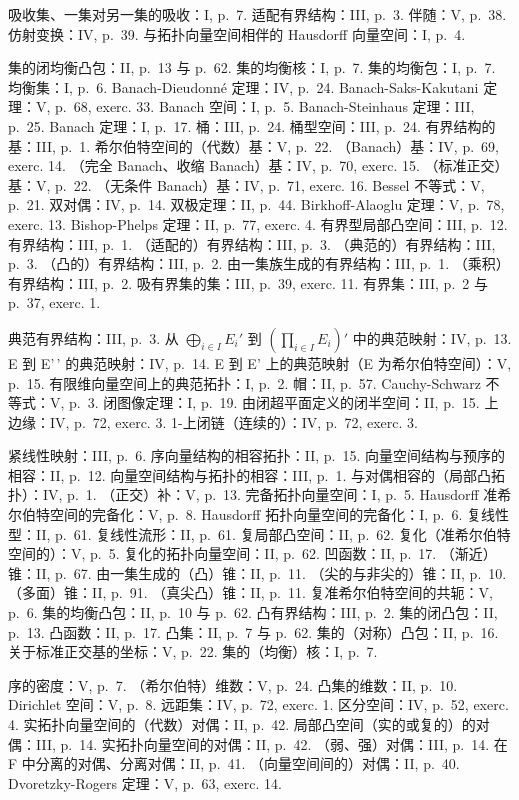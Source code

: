 
吸收集、一集对另一集的吸收：I, p.~7. 适配有界结构：III, p.~3. 伴随：V, p.~38. 仿射变换：IV, p.~39. 与拓扑向量空间相伴的 Hausdorff 向量空间：I, p.~4.

集的闭均衡凸包：II, p.~13 与 p.~62. 集的均衡核：I, p.~7. 集的均衡包：I, p.~7. 均衡集：I, p.~6. Banach-Dieudonné 定理：IV, p.~24. Banach-Saks-Kakutani 定理：V, p.~68, exerc. 33. Banach 空间：I, p.~5. Banach-Steinhaus 定理：III, p.~25. Banach 定理：I, p.~17. 桶：III, p.~24. 桶型空间：III, p.~24. 有界结构的基：III, p.~1. 希尔伯特空间的（代数）基：V, p.~22. （Banach）基：IV, p.~69, exerc. 14. （完全 Banach、收缩 Banach）基：IV, p.~70, exerc. 15. （标准正交）基：V, p.~22. （无条件 Banach）基：IV, p.~71, exerc. 16. Bessel 不等式：V, p.~21. 双对偶：IV, p.~14. 双极定理：II, p.~44. Birkhoff-Alaoglu 定理：V, p.~78, exerc. 13. Bishop-Phelps 定理：II, p.~77, exerc. 4. 有界型局部凸空间：III, p.~12. 有界结构：III, p.~1. （适配的）有界结构：III, p.~3. （典范的）有界结构：III, p.~3. （凸的）有界结构：III, p.~2. 由一集族生成的有界结构：III, p.~1. （乘积）有界结构：III, p.~2. 吸有界集的集：III, p.~39, exerc. 11. 有界集：III, p.~2 与 p.~37, exerc. 1.

典范有界结构：III, p.~3. 从 \(\bigoplus_{i\in I}E_i'\) 到 \(\left(\prod_{i\in I}E_i\right)'\) 中的典范映射：IV, p.~13. E 到 E'\,' 的典范映射：IV, p.~14. E 到 E' 上的典范映射（E 为希尔伯特空间）：V, p.~15. 有限维向量空间上的典范拓扑：I, p.~2. 帽：II, p.~57. Cauchy-Schwarz 不等式：V, p.~3. 闭图像定理：I, p.~19. 由闭超平面定义的闭半空间：II, p.~15. 上边缘：IV, p.~72, exerc. 3. 1-上闭链（连续的）：IV, p.~72, exerc. 3.

紧线性映射：III, p.~6. 序向量结构的相容拓扑：II, p.~15. 向量空间结构与预序的相容：II, p.~12. 向量空间结构与拓扑的相容：III, p.~1. 与对偶相容的（局部凸拓扑）：IV, p.~1. （正交）补：V, p.~13. 完备拓扑向量空间：I, p.~5. Hausdorff 准希尔伯特空间的完备化：V, p.~8. Hausdorff 拓扑向量空间的完备化：I, p.~6. 复线性型：II, p.~61. 复线性流形：II, p.~61. 复局部凸空间：II, p.~62. 复化（准希尔伯特空间的）：V, p.~5. 复化的拓扑向量空间：II, p.~62. 凹函数：II, p.~17. （渐近）锥：II, p.~67. 由一集生成的（凸）锥：II, p.~11. （尖的与非尖的）锥：II, p.~10. （多面）锥：II, p.~91. （真尖凸）锥：II, p.~11. 复准希尔伯特空间的共轭：V, p.~6. 集的均衡凸包：II, p.~10 与 p.~62. 凸有界结构：III, p.~2. 集的闭凸包：II, p.~13. 凸函数：II, p.~17. 凸集：II, p.~7 与 p.~62. 集的（对称）凸包：II, p.~16. 关于标准正交基的坐标：V, p.~22. 集的（均衡）核：I, p.~7.

序的密度：V, p.~7. （希尔伯特）维数：V, p.~24. 凸集的维数：II, p.~10. Dirichlet 空间：V, p.~8. 远距集：IV, p.~72, exerc. 1. 区分空间：IV, p.~52, exerc. 4. 实拓扑向量空间的（代数）对偶：II, p.~42. 局部凸空间（实的或复的）的对偶：III, p.~14. 实拓扑向量空间的对偶：II, p.~42. （弱、强）对偶：III, p.~14. 在 F 中分离的对偶、分离对偶：II, p.~41. （向量空间间的）对偶：II, p.~40. Dvoretzky-Rogers 定理：V, p.~63, exerc. 14.

